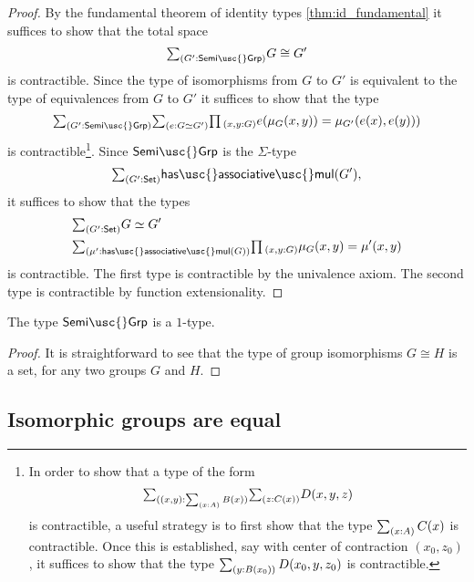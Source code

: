 \begin{proof}
By the fundamental theorem of identity types \cref{thm:id_fundamental} it suffices to show that the total space
\begin{equation*}
\sm{G':\mathsf{Semi\usc{}Grp}}G\cong G'
\end{equation*}
is contractible. Since the type of isomorphisms from $G$ to $G'$ is equivalent to the type of equivalences from $G$ to $G'$ it suffices to show that the type
\begin{equation*}
  \sm{G':\mathsf{Semi\usc{}Grp}}\sm{e:\eqv{G}{G'}}\prd{x,y:G}e(\mu_G(x,y))=\mu_{G'}(e(x),e(y)))
\end{equation*}
is contractible\footnote{In order to show that a type of the form
  \begin{equation*}
    \sm{(x,y):\sm{x:A}B(x)}\sm{z:C(x)}D(x,y,z)
  \end{equation*}
  is contractible, a useful strategy is to first show that the type $\sm{x:A}C(x)$ is contractible. Once this is established, say with center of contraction $(x_0,z_0)$, it suffices to show that the type $\sm{y:B(x_0)}D(x_0,y,z_0)$ is contractible.}. Since $\mathsf{Semi\usc{}Grp}$ is the $\Sigma$-type
\begin{equation*}
  \sm{G':\mathsf{Set}}\mathsf{has\usc{}associative\usc{}mul}(G'),
\end{equation*}
it suffices to show that the types
\begin{align*}
  & \sm{G':\mathsf{Set}}\eqv{G}{G'} \\
  & \sm{\mu':\mathsf{has\usc{}associative\usc{}mul}(G)}\prd{x,y:G}\mu_G(x,y)=\mu'(x,y)
\end{align*}
is contractible. The first type is contractible by the univalence axiom. The second type is contractible by function extensionality.
\end{proof}

\begin{cor}
The type $\mathsf{Semi\usc{}Grp}$ is a $1$-type.
\end{cor}

\begin{proof}
It is straightforward to see that the type of group isomorphisms $G\cong H$ is a set, for any two groups $G$ and $H$.
\end{proof}

\subsection{Isomorphic groups are equal}

